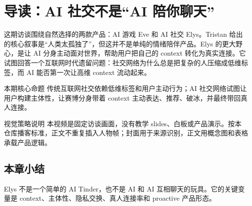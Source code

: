\section{导读：AI 社交不是“AI 陪你聊天”}

这期访谈围绕自然选择的两款产品：AI 游戏 Eve 和 AI 社交 Elys。Tristan 给出的核心叙事是“人类太孤独了”，但这并不是单纯的情绪陪伴产品。Elys 的更大野心，是让 AI 分身主动面对世界，帮助用户把自己的 context 转化为真实连接。它试图回答一个互联网时代遗留问题：社交网络为什么总是把复杂的人压缩成低维标签，而 AI 能否第一次让高维 context 流动起来。

\begin{importantbox}{本期核心命题}
传统互联网社交依赖低维标签和用户主动行为；AI 社交网络试图让用户构建主体性，让赛博分身带着 context 主动表达、推荐、破冰，并最终带回真人连接。
\end{importantbox}

\begin{knowledgebox}{视觉策略说明}
本视频是固定访谈画面，没有教学 slides、白板或产品演示。按本仓库播客标准，正文不重复插入人物帧；封面用于来源识别，正文用概念图和表格承载产品逻辑。
\end{knowledgebox}

\subsection{本章小结}

Elys 不是一个简单的 AI Tinder，也不是 AI 和 AI 互相聊天的玩具。它的关键变量是 context、主体性、隐私交换、真人连接率和 proactive 产品形态。

